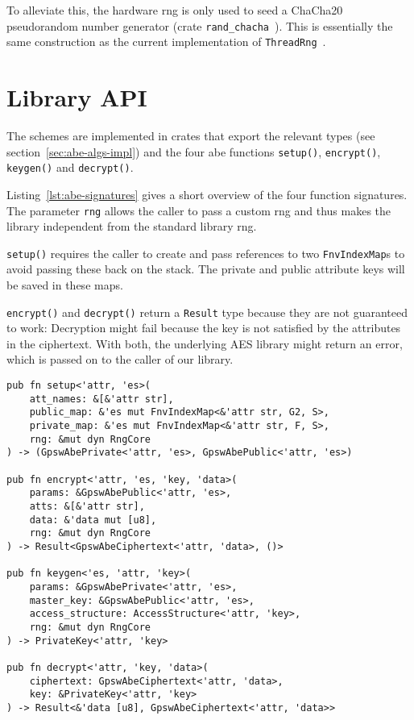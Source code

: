 To alleviate this, the hardware \acrshort{rng} is only used to seed a ChaCha20 pseudorandom number generator (\gls{crate} \texttt{rand\_chacha}~\cite{noauthor_rand_chacha_nodate}).
This is essentially the same construction as the current implementation of \texttt{ThreadRng}~\cite{noauthor_rust_nodate}.

\section{Library API}
The schemes are implemented in \glspl{crate} that export the relevant types (see section~\ref{sec:abe-algs-impl}) and the four \acrshort{abe} functions \texttt{setup()}, \texttt{encrypt()}, \texttt{keygen()} and \texttt{decrypt()}.

Listing~\ref{lst:abe-signatures} gives a short overview of the four function signatures.
The parameter \texttt{rng} allows the caller to pass a custom \acrlong{rng} and thus makes the library independent from the standard library \acrshort{rng}.

\texttt{setup()} requires the caller to create and pass references to two \texttt{FnvIndexMap}s to avoid passing these back on the stack.
The private and public attribute keys will be saved in these maps.

\texttt{encrypt()} and \texttt{decrypt()} return a \texttt{Result} type because they are not guaranteed to work: 
Decryption might fail because the key is not satisfied by the attributes in the ciphertext.
With both, the underlying AES library might return an error, which is passed on to the caller of our library.

\begin{lstlisting}[float=h!,caption={Exported function signatures of the GPSW scheme},label={lst:abe-signatures}]
pub fn setup<'attr, 'es>(
    att_names: &[&'attr str], 
    public_map: &'es mut FnvIndexMap<&'attr str, G2, S>, 
    private_map: &'es mut FnvIndexMap<&'attr str, F, S>, 
    rng: &mut dyn RngCore
) -> (GpswAbePrivate<'attr, 'es>, GpswAbePublic<'attr, 'es>) 

pub fn encrypt<'attr, 'es, 'key, 'data>(
    params: &GpswAbePublic<'attr, 'es>, 
    atts: &[&'attr str], 
    data: &'data mut [u8], 
    rng: &mut dyn RngCore
) -> Result<GpswAbeCiphertext<'attr, 'data>, ()> 

pub fn keygen<'es, 'attr, 'key>(
    params: &GpswAbePrivate<'attr, 'es>, 
    master_key: &GpswAbePublic<'attr, 'es>, 
    access_structure: AccessStructure<'attr, 'key>, 
    rng: &mut dyn RngCore
) -> PrivateKey<'attr, 'key> 

pub fn decrypt<'attr, 'key, 'data>(
    ciphertext: GpswAbeCiphertext<'attr, 'data>, 
    key: &PrivateKey<'attr, 'key>
) -> Result<&'data [u8], GpswAbeCiphertext<'attr, 'data>> 
\end{lstlisting}

